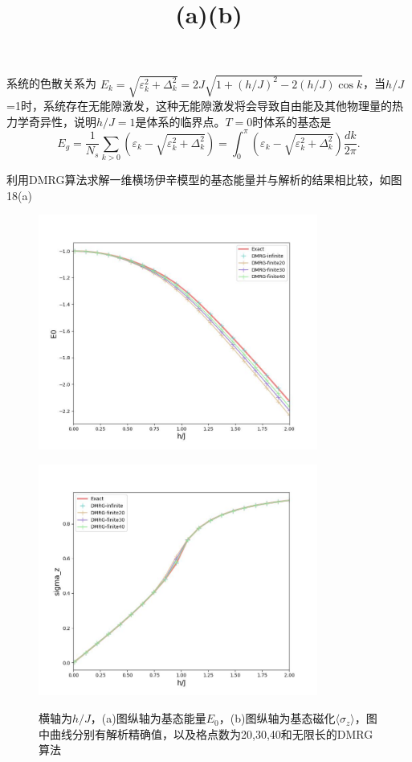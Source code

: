 \documentclass[12pt]{article}
\begin{document}
      
      系统的色散关系为 $E_k=\sqrt{\varepsilon_k^2+\Delta_k^2}=2J\sqrt{1+(h/J)^2-2(h/J)\cos k}$，当$h/J$=1时，系统存在无能隙激发，这种无能隙激发将会导致自由能及其他物理量的热力学奇异性，说明$h/J=1$是体系的临界点。$T=0$时体系的基态是
      \begin{equation}E_g=\frac{1}{N_s}\sum_{k>0}(\varepsilon_k-\sqrt{\varepsilon_k^2+\Delta_k^2})=\int_{0}^{\pi}(\varepsilon_k-\sqrt{\varepsilon_k^2+\Delta_k^2})\frac{dk}{2\pi}.\end{equation}
      
      利用DMRG算法求解一维横场伊辛模型的基态能量并与解析的结果相比较，如图18(a)
      \begin{figure}[H]
      	\centering
      	\begin{minipage}{0.49\linewidth}
      		\centering
      		\includegraphics[width=260pt]{TFIM基态}
      		\title{(a)}
      		\label{fig:18}
      	\end{minipage}%
      	\begin{minipage}{0.49\linewidth}
      		\centering
      		\includegraphics[width=260pt]{TFIMSz0}
      		\title{(b)}
      		\label{fig:19}
      	\end{minipage}
      \caption[9pt]{横轴为$h/J$，(a)图纵轴为基态能量$E_0$，(b)图纵轴为基态磁化$\langle\sigma_z\rangle$，图中曲线分别有解析精确值，以及格点数为20,30,40和无限长的DMRG算法}
      \end{figure}
      
\end{document}

